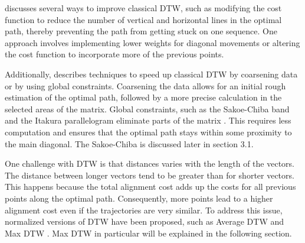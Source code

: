 \textcite{muller2007dynamic} discusses several ways to improve classical DTW, such as modifying the cost function to reduce the number of vertical and horizontal lines in the optimal path, thereby preventing the path from getting stuck on one sequence. One approach involves implementing lower weights for diagonal movements or altering the cost function to incorporate more of the previous points.

Additionally, \textcite{muller2007dynamic} describes techniques to speed up classical DTW by coarsening data or by using global constraints. Coarsening the data allows for an initial rough estimation of the optimal path, followed by a more precise calculation in the selected areas of the matrix. Global constraints, such as the Sakoe-Chiba band and the Itakura parallelogram eliminate parts of the matrix \cite{muller2007dynamic}. This requires less computation and ensures that the optimal path stays within some proximity to the main diagonal. The Sakoe-Chiba is discussed later in section 3.1.

One challenge with DTW is that distances varies with the length of the vectors. The distance between longer vectors tend to be greater than for shorter vectors. This happens because the total alignment cost adds up the costs for all previous points along the optimal path. Consequently, more points lead to a higher alignment cost even if the trajectories are very similar. To address this issue, normalized versions of DTW have been proposed, such as Average DTW and Max DTW \cite{zhao2018rest}. Max DTW in particular will be explained in the following section.

